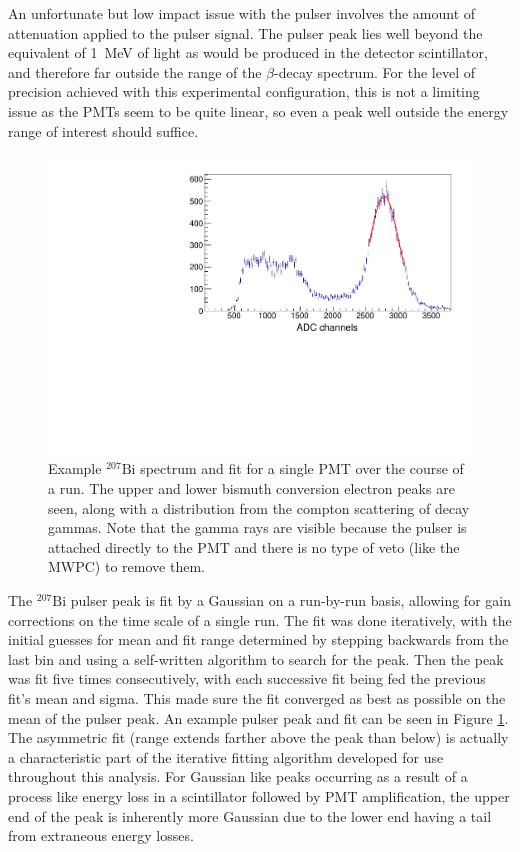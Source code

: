 An unfortunate but low impact issue with the pulser involves the amount of attenuation applied to the
pulser signal. The pulser peak lies well beyond the equivalent of 1~MeV of light as would be produced
in the detector scintillator, and therefore far outside the range of the $\beta$-decay spectrum.
For the level of precision achieved with this experimental configuration, this
is not a limiting issue as the PMTs seem to be quite linear, so even a peak well outside the
energy range of interest should suffice.

\begin{figure}[h] 
\centering
\includegraphics[scale=.60]{3-UCNAAnalysis/gain_bismuth2.pdf}
\caption{Example $^{207}\mathrm{Bi}$ spectrum and fit for a single PMT over
  the course of a run. The upper and lower bismuth conversion electron peaks are
  seen, along with a distribution from the compton scattering of decay gammas. Note that the gamma rays are
  visible because the pulser is attached directly to the PMT and there is no type
  of veto (like the MWPC) to remove them.}
\label{fig:biPulser}
\end{figure}

The $^{207}\mathrm{Bi}$ pulser peak is fit by a Gaussian on a run-by-run basis, allowing for gain corrections on the time
scale of a single run. The fit was done iteratively, with the initial guesses for mean and fit range determined
by stepping backwards from the last bin and using a self-written algorithm to search for the peak. Then the peak
was fit five times consecutively, with each successive fit being fed the previous fit's mean and sigma. This
made sure the fit converged as best as possible on the mean of the pulser peak. An example pulser peak and fit
can be seen in Figure \ref{fig:biPulser}. The asymmetric fit (range extends farther above the peak than below)
is actually a characteristic part of the iterative
fitting algorithm developed for use throughout this analysis. For Gaussian like peaks occurring as a result of
a process like energy loss in a scintillator followed by PMT amplification, the upper end of the peak is
inherently more Gaussian due to the lower end having a tail from extraneous energy losses. 


